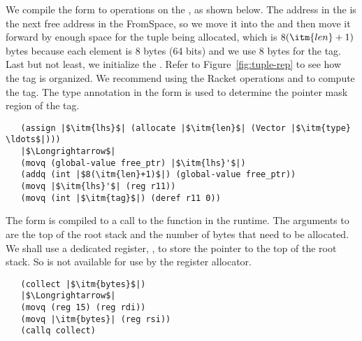 \documentclass[11pt]{book}
\begin{document}
We compile the  form to operations on the
, as shown below. The address in the 
is the next free address in the FromSpace, so we move it into the
 and then move it forward by enough space for the tuple being
allocated, which is $8(\itm{len}+1)$ bytes because each element is 8
bytes (64 bits) and we use 8 bytes for the tag. Last but not least, we
initialize the . Refer to Figure~\ref{fig:tuple-rep} to see
how the tag is organized. We recommend using the Racket operations
 and  to compute the tag.
The type annotation in the  form is used to determine the
pointer mask region of the tag.
\begin{lstlisting}
   (assign |$\itm{lhs}$| (allocate |$\itm{len}$| (Vector |$\itm{type} \ldots$|)))
   |$\Longrightarrow$|
   (movq (global-value free_ptr) |$\itm{lhs}'$|)
   (addq (int |$8(\itm{len}+1)$|) (global-value free_ptr))
   (movq |$\itm{lhs}'$| (reg r11))
   (movq (int |$\itm{tag}$|) (deref r11 0))
\end{lstlisting}

The  form is compiled to a call to the 
function in the runtime. The arguments to  are the top
of the root stack and the number of bytes that need to be allocated.
We shall use a dedicated register, , to store the pointer to
the top of the root stack. So  is not available for use by
the register allocator.
\begin{lstlisting}
   (collect |$\itm{bytes}$|)
   |$\Longrightarrow$|
   (movq (reg 15) (reg rdi))
   (movq |\itm{bytes}| (reg rsi))
   (callq collect)
\end{lstlisting}
\end{document}
